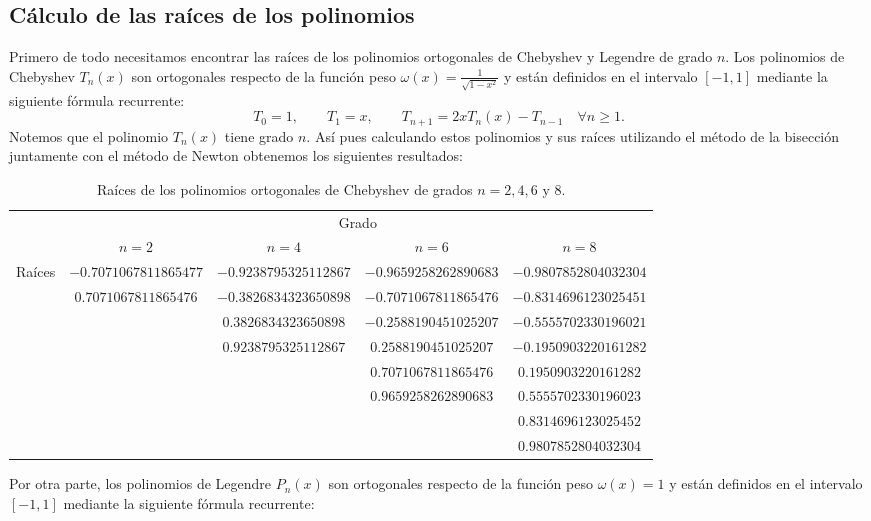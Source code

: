 \documentclass[a4paper]{article}
\begin{document}
\subsection*{Cálculo de las raíces de los polinomios}
Primero de todo necesitamos encontrar las raíces de los polinomios ortogonales de Chebyshev y Legendre de grado $n$. Los polinomios de Chebyshev $T_n(x)$ son ortogonales respecto de la función peso $\omega(x)=\frac{1}{\sqrt{1-x^2}}$ y están definidos en el intervalo $[-1,1]$ mediante la siguiente fórmula recurrente:
$$T_0=1,\qquad T_1=x,\qquad T_{n+1}=2xT_n(x)-T_{n-1}\quad\forall n\geq 1.$$ Notemos que el polinomio $T_n(x)$ tiene grado $n$. Así pues calculando estos polinomios y sus raíces utilizando el método de la bisección juntamente con el método de Newton obtenemos los siguientes resultados:
\begin{table}[ht]
    \centering
    \begin{tabular}{|c|c|c|c|c|}
        \cline{2-5}
        \multicolumn{1}{c|}{} & \multicolumn{4}{c|}{Grado}\\
        \cline{2-5}
        \multicolumn{1}{c|}{} & $n=2$ & $n=4$ & $n=6$ & $n=8$ \\
        \hline
        \multirow{8}{*}{Raíces} & $-0.7071067811865477$ & $-0.9238795325112867$ & $-0.9659258262890683$ & $-0.9807852804032304$ \\
        & $0.7071067811865476$ & $-0.3826834323650898$ & $-0.7071067811865476$ & $-0.8314696123025451$ \\
        & & $0.3826834323650898$ & $-0.2588190451025207$ & $-0.5555702330196021$ \\
        & & $0.9238795325112867$ & $0.2588190451025207$ & $-0.1950903220161282$ \\
        & & & $0.7071067811865476$ & $0.1950903220161282$ \\
        & & & $0.9659258262890683$ & $0.5555702330196023$ \\
        & & & & $0.8314696123025452$ \\
        & & & & $0.9807852804032304$ \\
        \hline
    \end{tabular}
    \caption{Raíces de los polinomios ortogonales de Chebyshev de grados $n=2,4,6\text{ y }8$.}
\end{table}\par
Por otra parte, los polinomios de Legendre $P_n(x)$ son ortogonales respecto de la función peso $\omega(x)=1$ y están definidos en el intervalo $[-1,1]$ mediante la siguiente fórmula recurrente:
\end{document}
